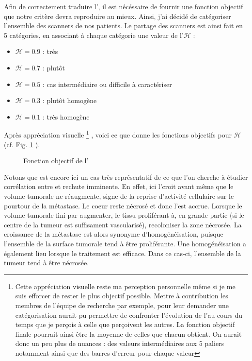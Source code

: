 \documentclass[main.tex]{subfiles}
\begin{document}
Afin de correctement traduire l'\hetero, il est nécéssaire de fournir une fonction objectif que notre critère devra reproduire au mieux. Ainsi, j'ai décidé de catégoriser l'ensemble des scanners de nos patients. Le partage des scanners est ainsi fait en 5 catégories, en associant à chaque catégorie une valeur de l'\hetero $\mathscr{H}$ :
\begin{itemize}
\item $\mathscr{H}=0.9$ : très \heterogene
\item $\mathscr{H}=0.7$ : plutôt \heterogene
\item $\mathscr{H}=0.5$ : cas intermédiaire ou difficile à caractériser
\item $\mathscr{H}=0.3$ : plutôt homogène
\item  $\mathscr{H}=0.1$ : très homogène
\end{itemize}
Après appréciation visuelle \footnote{\samepage Cette appréciation visuelle reste ma perception personnelle même si je me suis efforcer de rester le plus objectif possible. Mettre à contribution les membres de l'équipe de recherche par exemple, pour leur demander une catégorisation aurait pu permettre de confronter l'évolution de l'\hetero au cours du temps que je perçois à celle que perçoivent les autres. La fonction objectif finale pourrait ainsi être la moyenne de celles que chacun obtient. On aurait donc un peu plus de nuances : des valeurs intermédiaires aux 5 paliers notamment ainsi que des barres d'erreur pour chaque valeur}
, voici ce que donne les fonctions objectifs pour $\mathscr{H}$ (cf. Fig. \ref{fig:hetero_visuelle} ).

\begin{figure}
\caption{\label{fig:hetero_visuelle}Fonction objectif de l'\hetero}
\end{figure}

Notons que \Nber est encore ici un cas très représentatif de ce que l'on cherche à étudier \ie corrélation entre \hetero et rechute imminente. En effet, ici l'\hetero croit avant même que le volume tumorale ne réaugmente, signe de la reprise d'activité cellulaire sur le pourtour de la métastase. Le coeur reste nécrosé et donc l'\hetero est accrue. Lorsque le volume tumorale fini par augmenter, le tissu proliférant à, en grande partie (si le centre de la tumeur est suffisament vascularisé), recoloniser la zone nécrosée. La croissance de la métastase est alors synonyme d'homogénéisation, puisque l'ensemble de la surface tumorale tend à être proliférante. Une homogénéisation a également lieu lorsque le traitement est efficace. Dans ce cas-ci, l'ensemble de la tumeur tend à être nécrosée.
\end{document}

